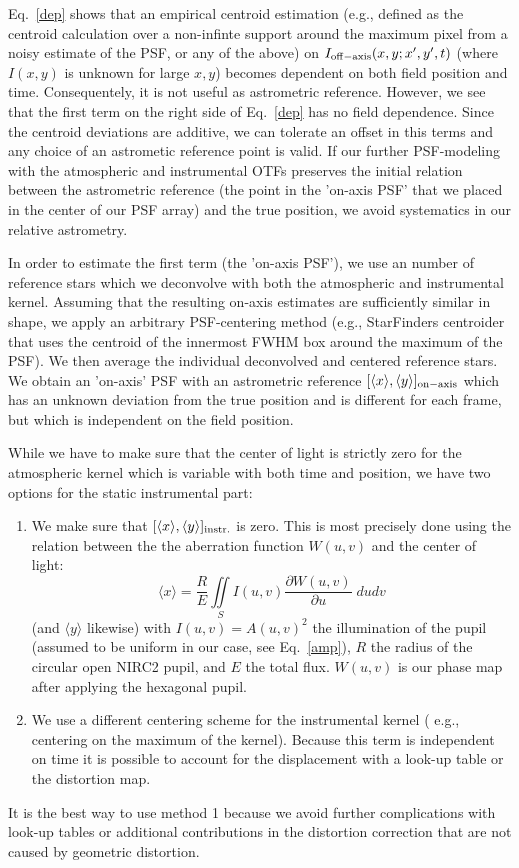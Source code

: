  
Eq.~\ref{dep} shows that an empirical centroid estimation (e.g., defined as the centroid calculation over a non-infinte support around the maximum pixel from a noisy estimate of the PSF, or any of the above) on $I_{\rm{off-axis}}(x,y; x',y',t)$ (where $I(x,y)$ is unknown for large $x,y$) becomes dependent on both field position and time. Consequentely, it is not useful as astrometric reference. However, we see that the first term on the right side of Eq.~\ref{dep} has no field dependence. Since the centroid deviations are additive, we can tolerate an offset in this terms and any choice of an astrometic reference point is valid. If our further PSF-modeling with the atmospheric and instrumental OTFs preserves the initial relation between the astrometric reference (the point in the 'on-axis PSF' that we placed in the center of our PSF array) and the true position, we avoid systematics in our relative astrometry.

In order to estimate the first term (the 'on-axis PSF'), we use an number of reference stars which we deconvolve with both the atmospheric and instrumental kernel. Assuming that the resulting on-axis estimates are sufficiently similar in shape, we apply an arbitrary PSF-centering method (e.g., StarFinders centroider that uses the centroid of the innermost FWHM box around the maximum of the PSF). We then average the individual deconvolved and centered reference stars. We obtain an 'on-axis' PSF with an astrometric reference $[\langle x \rangle , \langle y \rangle]_{\rm{on-axis}}$ which has an unknown deviation from the true position and is different for each frame, but which is independent on the field position. 

While we have to make sure that the center of light is strictly zero for the atmospheric kernel which is variable with both time and position, we have two options for the static instrumental part:

\begin{enumerate}

\item
We make sure that $[\langle x \rangle , \langle y \rangle]_{\rm{instr.}}$ is zero. This is most precisely done using the relation between the the aberration function $W(u,v)$ and the center of light:
\begin{equation}
\langle x \rangle = \frac{R}{E} \iint \limits_S I(u,v) \frac{\partial W(u,v)}{\partial u} \; du dv
\end{equation}
(and $\langle y \rangle$ likewise) with $I(u,v) = A(u,v)^2$ the illumination of the pupil (assumed to be uniform in our case, see Eq.~\ref{amp}), $R$ the radius of the circular open NIRC2 pupil, and $E$ the total flux. $W(u,v)$ is our phase map after applying the hexagonal pupil.
\item
We use a different centering scheme for the instrumental kernel ( e.g., centering on the maximum of the kernel). Because this term is independent on time it is possible to account for the displacement with a look-up table or the distortion map. 
\end{enumerate}

It is the best way to use method 1 because we avoid further complications with look-up tables or additional contributions in the distortion correction that are not caused by geometric distortion.


